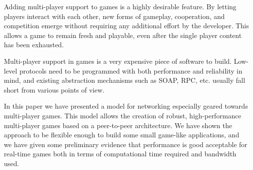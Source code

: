 Adding multi-player support to games is a highly desirable feature. By letting players interact with each other, new forms of gameplay, cooperation, and competition emerge without requiring any additional effort by the developer. This allows a game to remain fresh and playable, even after the single player content has been exhausted.

Multi-player support in games is a very expensive piece of software to build. Low-level protocols need to be programmed with both performance and reliability in mind, and existing abstraction mechanisms such as SOAP, RPC, etc. usually fall short from various points of view.

In this paper we have presented a model for networking especially geared towards multi-player games. This model allows the creation of robust, high-performance multi-player games based on a peer-to-peer architecture. We have shown the approach to be flexible enough to build some small game-like applications, and we have given some preliminary evidence that performance is good acceptable for real-time games both in terms of computational time required and bandwidth used.
